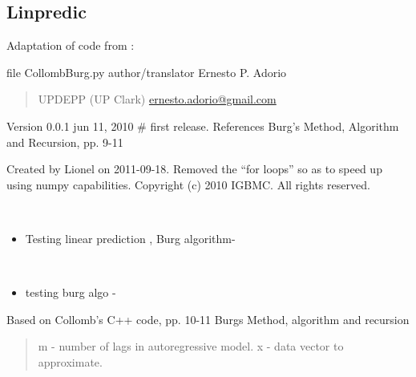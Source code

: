 \documentclass[letterpaper,10pt,openany,oneside]{sphinxmanual}
\begin{document}
\subsection{Linpredic}
\label{rst/code:linpredic}\label{rst/code:module-Algo.Linpredic}
Adaptation of code from :

file              CollombBurg.py
author/translator Ernesto P. Adorio
\begin{quote}

UPDEPP (UP Clark)
\href{mailto:ernesto.adorio@gmail.com}{ernesto.adorio@gmail.com}
\end{quote}

Version           0.0.1 jun 11, 2010 \# first release.
References        Burg's Method, Algorithm and Recursion, pp. 9-11

Created by Lionel on 2011-09-18.
Removed the ``for loops'' so as to speed up using numpy capabilities.
Copyright (c) 2010 IGBMC. All rights reserved.

\begin{fulllineitems}
\label{rst/code:Algo.Linpredic.LinpredTests}~\begin{itemize}
\item {} 
Testing linear prediction , Burg algorithm-

\end{itemize}

\begin{fulllineitems}
\label{rst/code:Algo.Linpredic.LinpredTests.test_burg}~\begin{itemize}
\item {} 
testing burg algo -

\end{itemize}

\end{fulllineitems}


\end{fulllineitems}


\begin{fulllineitems}
\label{rst/code:Algo.Linpredic.burg}
Based on Collomb's C++ code, pp. 10-11
Burgs Method, algorithm and recursion
\begin{quote}

m - number of lags in autoregressive model.
x  - data vector to approximate.
\end{quote}

\end{fulllineitems}
\end{document}
